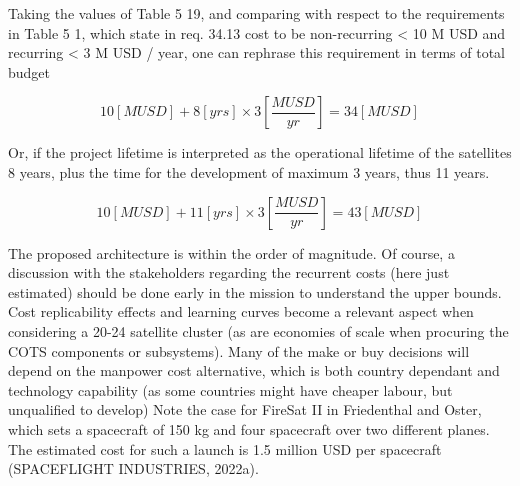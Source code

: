 Taking the values of Table 5 19, and comparing with respect to the requirements in Table 5 1, which state in req. 34.13 cost to be non-recurring < 10 M USD and recurring < 3 M USD / year, one can rephrase this requirement in terms of total budget 

\[10\left[MUSD\right]+8\left[yrs\right]\times3\left[\frac{MUSD}{yr}\right]=34[MUSD]\]

Or, if the project lifetime is interpreted as the operational lifetime of the satellites 8 years, plus the time for the development of maximum 3 years, thus 11 years.

\[10 \left[ MUSD \right] + 11 \left[ yrs\right] \times 3\left[ \frac{MUSD}{yr} \right] = 43 [MUSD]\]

The proposed architecture is within the order of magnitude. Of course, a discussion with the stakeholders regarding the recurrent costs (here just estimated) should be done early in the mission to understand the upper bounds. Cost replicability effects and learning curves become a relevant aspect when considering a 20-24 satellite cluster (as are economies of scale when procuring the COTS components or subsystems).
Many of the make or buy decisions will depend on the manpower cost alternative, which is both country dependant and technology capability (as some countries might have cheaper labour, but unqualified to develop)
Note the case for FireSat II in Friedenthal and Oster, which sets a spacecraft of 150 kg and four spacecraft over two different planes. The estimated cost for such a launch is 1.5 million USD per spacecraft (SPACEFLIGHT INDUSTRIES, 2022a).